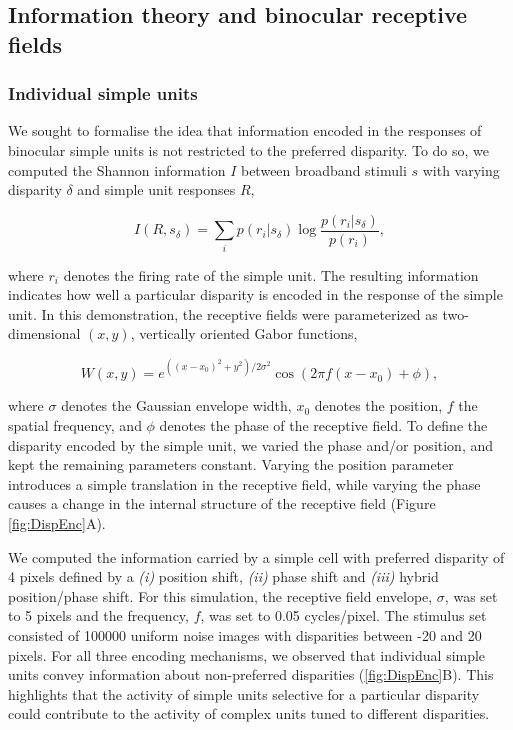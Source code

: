 \subsection{Information theory and binocular receptive fields}

\subsubsection*{Individual simple units}
We sought to formalise the idea that information encoded in the responses of binocular simple units is not restricted to the preferred disparity. To do so, we computed the Shannon information $I$ between broadband stimuli $s$ with varying disparity $\delta$ and simple unit responses $R$,

\begin{equation}
  I(R, s_\delta) = \sum_i p(r_i|s_\delta) \log \frac{p(r_i|s_\delta)}{p(r_i)},
  \label{eq:ShannonInformation}
\end{equation}
 
where $r_i$ denotes the firing rate of the simple unit. The resulting information indicates how well a particular disparity is encoded in the response of the simple unit. In this demonstration, the receptive fields were parameterized as two-dimensional $(x,y)$, vertically oriented Gabor functions,

\begin{equation}
  W(x,y) = e^{((x-x_0)^2 + y^2)/2\sigma^2} \cos (2 \pi f (x-x_0) + \phi),
\end{equation}

where $\sigma$ denotes the Gaussian envelope width, $x_0$ denotes the position, $f$ the spatial frequency, and $\phi$ denotes the phase of the receptive field. To define the disparity encoded by the simple unit, we varied the phase and/or position, and kept the remaining parameters constant. Varying the position parameter introduces a simple translation in the receptive field, while varying the phase causes a change in the internal structure of the receptive field (Figure \ref{fig:DispEnc}A).

We computed the information carried by a simple cell with preferred disparity of 4 pixels defined by a \textit{(i)} position shift, \textit{(ii)} phase shift and \textit{(iii)} hybrid position/phase shift. For this simulation, the receptive field envelope, $\sigma$, was set to 5 pixels and the frequency, $f$, was set to 0.05 cycles/pixel. The stimulus set consisted of 100000 uniform noise images with disparities between -20 and 20 pixels. For all three encoding mechanisms, we observed that individual simple units convey information about non-preferred disparities (\ref{fig:DispEnc}B). This highlights that the activity of simple units selective for a particular disparity could contribute to the activity of complex units tuned to different disparities.

